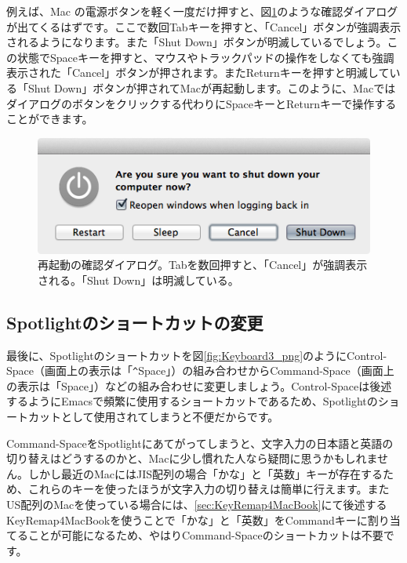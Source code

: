 例えば、Mac の電源ボタンを軽く一度だけ押すと、図\ref{fig:reboot_png}のような確認ダイアログが出てくるはずです。ここで数回Tabキーを押すと、「Cancel」ボタンが強調表示されるようになります。また「Shut Down」ボタンが明滅しているでしょう。この状態でSpaceキーを押すと、マウスやトラックパッドの操作をしなくても強調表示された「Cancel」ボタンが押されます。またReturnキーを押すと明滅している「Shut Down」ボタンが押されてMacが再起動します。このように、Macではダイアログのボタンをクリックする代わりにSpaceキーとReturnキーで操作することができます。

\begin{figure}
  \centering
  \includegraphics[scale=0.35]{fig/reboot.png}
  \caption{再起動の確認ダイアログ。Tabを数回押すと、「Cancel」が強調表示される。「Shut Down」は明滅している。}
  \label{fig:reboot_png}
\end{figure}

\subsection{Spotlightのショートカットの変更}
最後に、Spotlightのショートカットを図\ref{fig:Keyboard3_png}のようにControl-Space（画面上の表示は「\verb|^|Space」）の組み合わせからCommand-Space（画面上の表示は「\cmd{}Space」）などの組み合わせに変更しましょう。Control-Spaceは後述するようにEmacsで頻繁に使用するショートカットであるため、Spotlightのショートカットとして使用されてしまうと不便だからです。

Command-SpaceをSpotlightにあてがってしまうと、文字入力の日本語と英語の切り替えはどうするのかと、Macに少し慣れた人なら疑問に思うかもしれません。しかし最近のMacにはJIS配列の場合「かな」と「英数」キーが存在するため、これらのキーを使ったほうが文字入力の切り替えは簡単に行えます。またUS配列のMacを使っている場合には、\ref{sec:KeyRemap4MacBook}にて後述するKeyRemap4MacBookを使うことで「かな」と「英数」をCommandキーに割り当てることが可能になるため、やはりCommand-Spaceのショートカットは不要です。

